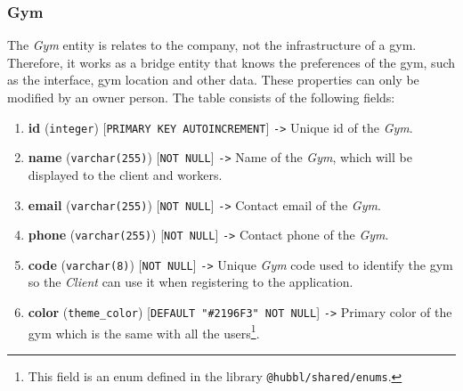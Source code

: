 \documentclass[a4paper, 12pt, oneside]{book}
\begin{document}
\subsubsection{Gym}
The \emph{Gym} entity is relates to the company, not the infrastructure of a gym. Therefore, it works as a bridge entity that knows the preferences of the gym, such as the interface, gym location and other data. These properties can only be modified by an owner person. The table consists of the following fields:
\begin{enumerate}[label = -]
	\item \textbf{id} (\texttt{integer}) [\texttt{PRIMARY KEY AUTOINCREMENT}] \texttt{->} Unique id of the \emph{Gym}.
	\item \textbf{name} (\texttt{varchar(255)}) [\texttt{NOT NULL}] \texttt{->} Name of the \emph{Gym}, which will be displayed to the client and workers.
	\item \textbf{email} (\texttt{varchar(255)}) [\texttt{NOT NULL}] \texttt{->} Contact email of the \emph{Gym}.
	\item \textbf{phone} (\texttt{varchar(255)}) [\texttt{NOT NULL}] \texttt{->} Contact phone of the \emph{Gym}.
	\item \textbf{code} (\texttt{varchar(8)}) [\texttt{NOT NULL}] \texttt{->} Unique \emph{Gym} code used to identify the gym so the \emph{Client} can use it when registering to the application.
	\item \textbf{color} (\texttt{theme\_color}) [\texttt{DEFAULT "\#2196F3" NOT NULL}] \texttt{->} Primary color of the gym which is the same with all the users\footnote{This field is an enum defined in the library \texttt{@hubbl/shared/enums}.}.
\end{enumerate}
\end{document}
